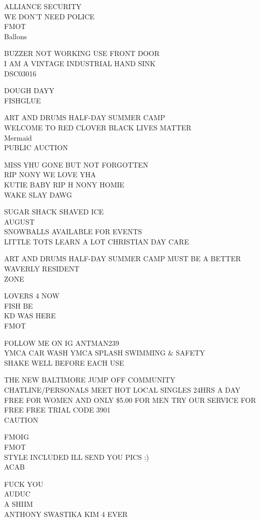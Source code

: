 \documentclass[10pt,letterpaper]{article}
\begin{document}
ALLIANCE SECURITY\\
WE DON'T NEED POLICE\\
FMOT\\
Ballons

BUZZER NOT WORKING USE FRONT DOOR\\
I AM A VINTAGE INDUSTRIAL HAND SINK\\
DSC03016

DOUGH DAYY\\
FISHGLUE

ART AND DRUMS HALF{-}DAY SUMMER CAMP\\
WELCOME TO RED CLOVER BLACK LIVES MATTER\\
Mermaid\\
PUBLIC AUCTION

MISS YHU GONE BUT NOT FORGOTTEN\\
RIP NONY WE LOVE YHA\\
KUTIE BABY RIP H NONY HOMIE\\
WAKE SLAY DAWG

SUGAR SHACK SHAVED ICE\\
AUGUST\\
SNOWBALLS AVAILABLE FOR EVENTS\\
LITTLE TOTS LEARN A LOT CHRISTIAN DAY CARE

ART AND DRUMS HALF{-}DAY SUMMER CAMP MUST BE A BETTER WAVERLY RESIDENT\\
ZONE

LOVERS 4 NOW\\
FISH BE\\
KD WAS HERE\\
FMOT

FOLLOW ME ON IG ANTMAN239\\
YMCA CAR WASH YMCA SPLASH SWIMMING \& SAFETY\\
SHAKE WELL BEFORE EACH USE

THE NEW BALTIMORE JUMP OFF COMMUNITY CHATLINE/PERSONALS MEET HOT LOCAL SINGLES 24HRS A DAY FREE FOR WOMEN AND ONLY \$5.00 FOR MEN TRY OUR SERVICE FOR FREE FREE TRIAL CODE 3901\\
CAUTION

FMOIG\\
FMOT\\
STYLE INCLUDED ILL SEND YOU PICS :)\\
ACAB

FUCK YOU\\
AUDUC\\
A SHIIM\\
ANTHONY SWASTIKA KIM 4 EVER
\end{document}
